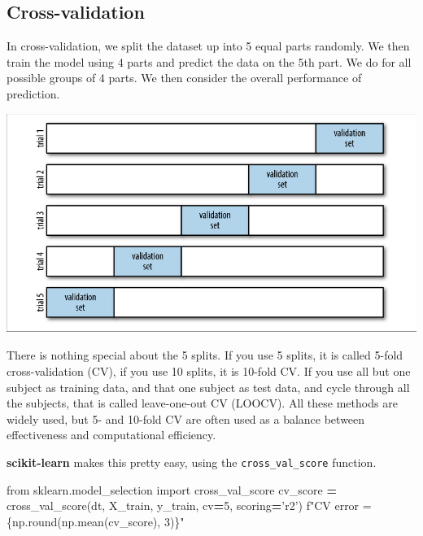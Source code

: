 \documentclass[
  letterpaper,
]{scrbook}
\newenvironment{Shaded}{\begin{snugshade}}{\end{snugshade}}
\newcommand{\BuiltInTok}[1]{#1}
\newcommand{\DecValTok}[1]{\textcolor[rgb]{0.00,0.00,0.81}{#1}}
\newcommand{\ImportTok}[1]{#1}
\newcommand{\NormalTok}[1]{#1}
\newcommand{\OperatorTok}[1]{\textcolor[rgb]{0.81,0.36,0.00}{\textbf{#1}}}
\newcommand{\SpecialCharTok}[1]{\textcolor[rgb]{0.00,0.00,0.00}{#1}}
\newcommand{\SpecialStringTok}[1]{\textcolor[rgb]{0.31,0.60,0.02}{#1}}
\newcommand{\StringTok}[1]{\textcolor[rgb]{0.31,0.60,0.02}{#1}}
\begin{document}
\hypertarget{cross-validation}{%
\subsection{Cross-validation}\label{cross-validation}}

In cross-validation, we split the dataset up into 5 equal parts randomly. We then train the
model using 4 parts and predict the data on the 5th part. We do for all possible groups of 4 parts. We then
consider the overall performance of prediction.

\includegraphics{graphs/CV5.png}

There is nothing special about the 5 splits. If you use 5 splits, it is called 5-fold cross-validation (CV), if you use 10 splits, it is 10-fold CV. If you use all but one subject as training data, and that one subject as test data, and cycle through all the subjects, that is called leave-one-out CV (LOOCV). All these methods are widely used, but 5- and 10-fold CV are often used as a balance between effectiveness and computational efficiency.

\textbf{scikit-learn} makes this pretty easy, using the \texttt{cross\_val\_score} function.

\begin{Shaded}
\begin{Highlighting}[]
\ImportTok{from}\NormalTok{ sklearn.model_selection }\ImportTok{import}\NormalTok{ cross_val_score}
\NormalTok{cv_score }\OperatorTok{=}\NormalTok{ cross_val_score(dt, X_train, y_train, cv}\OperatorTok{=}\DecValTok{5}\NormalTok{, scoring}\OperatorTok{=}\StringTok{'r2'}\NormalTok{)}
\SpecialStringTok{f"CV error = }\SpecialCharTok{\{np.}\BuiltInTok{round}\NormalTok{(np.mean(cv_score), }\DecValTok{3}\NormalTok{)}\SpecialCharTok{\}}\SpecialStringTok{"}
\end{Highlighting}
\end{Shaded}
\end{document}
